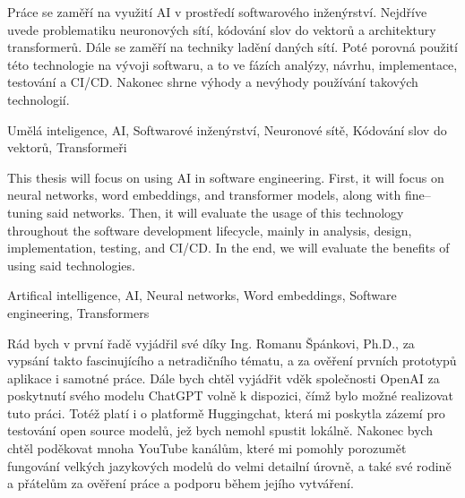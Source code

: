 \documentclass[FM,DP]{tulthesis}
\begin{document}
		
		
		\begin{abstractCZ}
			Práce se zaměří na využití AI v prostředí softwarového inženýrství. Nejdříve uvede problematiku neuronových sítí, kódování slov do vektorů a architektury transformerů. Dále se zaměří na techniky ladění daných sítí. Poté porovná použití této technologie na vývoji softwaru, a to ve fázích analýzy, návrhu, implementace, testování a CI/CD. Nakonec shrne výhody a nevýhody používání takových technologií.
		\end{abstractCZ}
		\begin{keywordsCZ}
			Umělá inteligence, AI, Softwarové inženýrství, Neuronové sítě, Kódování slov do vektorů, Transformeři
		\end{keywordsCZ}
		\vspace{1cm}
		
		\begin{abstractEN}
			This thesis will focus on using AI in software engineering. First, it will focus on neural networks, word embeddings, and transformer models, along with fine–tuning said networks. Then, it will evaluate the usage of this technology throughout the software development lifecycle, mainly in analysis, design, implementation, testing, and CI/CD. In the end, we will evaluate the benefits of using said technologies.
		\end{abstractEN}
		
		\begin{keywordsEN}
			Artifical intelligence, AI, Neural networks, Word embeddings, Software engineering, Transformers
		\end{keywordsEN}
		
		\clearpage
		
		\begin{acknowledgement}
			Rád bych v první řadě vyjádřil své díky Ing. Romanu Špánkovi, Ph.D., za vypsání takto fascinujícího a netradičního tématu, a za ověření prvních prototypů aplikace i samotné práce. Dále bych chtěl vyjádřit vděk společnosti OpenAI za poskytnutí svého modelu ChatGPT volně k dispozici, čímž bylo možné realizovat tuto práci. Totéž platí i o platformě Huggingchat, která mi poskytla zázemí pro testování open source modelů, jež bych nemohl spustit lokálně. Nakonec bych chtěl poděkovat mnoha YouTube kanálům, které mi pomohly porozumět fungování velkých jazykových modelů do velmi detailní úrovně, a také své rodině a přátelům za ověření práce a podporu během jejího vytváření.
		\end{acknowledgement}
		
\end{document}
